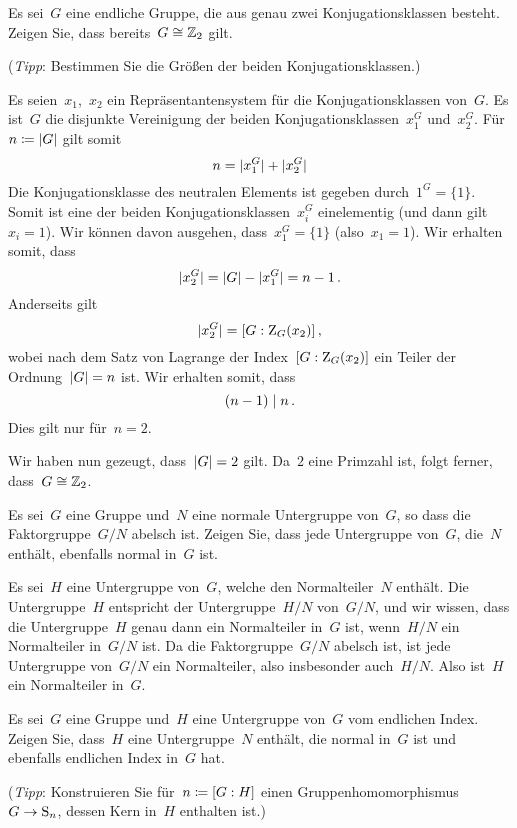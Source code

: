 \documentclass{scrartcl}
\begin{document}
\begin{exercise}
  Es sei~$G$ eine endliche Gruppe, die aus genau zwei Konjugationsklassen besteht.
  Zeigen Sie, dass bereits~$G \cong \mathbb{Z}_2$ gilt.

  (\emph{Tipp}: Bestimmen Sie die Größen der beiden Konjugationsklassen.)
\end{exercise}

\begin{solution}
  Es seien~$x_1$,~$x_2$ ein Repräsentantensystem für die Konjugationsklassen von~$G$.
  Es ist~$G$ die disjunkte Vereinigung der beiden Konjugationsklassen~$x_1^G$ und~$x_2^G$.
  Für~$n \coloneqq \lvert G\rvert$ gilt somit
  \[
    n
    =
    \lvert x_1^G\rvert + \lvert x_2^G\rvert
  \]
  Die Konjugationsklasse des neutralen Elements ist gegeben durch~$1^G = \{ 1 \}$.
  Somit ist eine der beiden Konjugationsklassen~$x_i^G$ einelementig (und dann gilt~$x_i = 1$).
  Wir können davon ausgehen, dass~$x_1^G = \{ 1 \}$ (also~$x_1 = 1$).
  Wir erhalten somit, dass
  \[
    \lvert x_2^G \rvert
    =
    \lvert G\rvert - \lvert x_1^G \rvert
    =
    n - 1 \,.
  \]
  Anderseits gilt
  \[
    \lvert x_2^G \rvert
    =
    [G : \operatorname{Z}_G(x_2)] \,,
  \]
  wobei nach dem Satz von Lagrange der Index~$[G : \operatorname{Z}_G(x_2)]$ ein Teiler der Ordnung~$\lvert G\rvert = n$ ist.
  Wir erhalten somit, dass
  \[
    (n-1) \mid n \,.
  \]
  Dies gilt nur für~$n = 2$.

  Wir haben nun gezeugt, dass~$\lvert G\rvert = 2$ gilt.
  Da~$2$ eine Primzahl ist, folgt ferner, dass~$G \cong \mathbb{Z}_2$.
\end{solution}

\begin{exercise}
  Es sei~$G$ eine Gruppe und~$N$ eine normale Untergruppe von~$G$, so dass die Faktorgruppe~$G/N$ abelsch ist.
  Zeigen Sie, dass jede Untergruppe von~$G$, die~$N$ enthält, ebenfalls normal in~$G$ ist.
\end{exercise}

\begin{solution}
  Es sei~$H$ eine Untergruppe von~$G$, welche den Normalteiler~$N$ enthält.
  Die Untergruppe~$H$ entspricht der Untergruppe~$H/N$ von~$G/N$, und wir wissen, dass die Untergruppe~$H$ genau dann ein Normalteiler in~$G$ ist, wenn~$H/N$ ein Normalteiler in~$G/N$ ist.
  Da die Faktorgruppe~$G/N$ abelsch ist, ist jede Untergruppe von~$G/N$ ein Normalteiler, also insbesonder auch~$H/N$.
  Also ist~$H$ ein Normalteiler in~$G$.
\end{solution}

\begin{exercise}
  Es sei~$G$ eine Gruppe und~$H$ eine Untergruppe von~$G$ vom endlichen Index.
  Zeigen Sie, dass~$H$ eine Untergruppe~$N$ enthält, die normal in~$G$ ist und ebenfalls endlichen Index in~$G$ hat.

  (\emph{Tipp}: Konstruieren Sie für~$n \coloneqq [G : H]$ einen Gruppenhomomorphismus~$G \to \Sym_n$, dessen Kern in~$H$ enthalten ist.)
\end{exercise}
\end{document}
